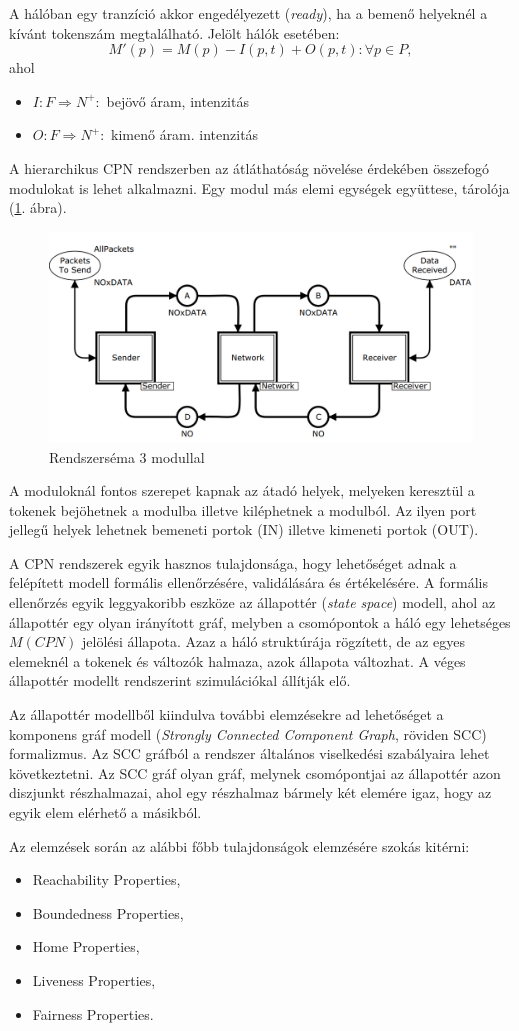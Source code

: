 A hálóban egy tranzíció akkor engedélyezett (\textit{ready}), ha a bemenő helyeknél a kívánt tokenszám megtalálható.
Jelölt hálók esetében:
\[
M'(p)=M(p)-I(p,t)+O(p,t): \forall p\in P,
\]
ahol 
\begin{itemize}
\item $I:F\Rightarrow N^+:$  bejövő áram, intenzitás
\item $O:F\Rightarrow N^+:$ kimenő áram. intenzitás
\end{itemize}

A hierarchikus CPN rendszerben az átláthatóság növelése érdekében összefogó modulokat is lehet alkalmazni. Egy modul más elemi egységek együttese, tárolója (\ref{fig:schema}. ábra).

\begin{figure}[h!]
\centering
\includegraphics[scale=0.5]{images/rendszersema3modul.png}
\caption{Rendszerséma 3 modullal}
\label{fig:schema}
\end{figure}

A moduloknál fontos szerepet kapnak az átadó helyek, melyeken keresztül a tokenek bejöhetnek a modulba illetve kiléphetnek a modulból. Az ilyen port jellegű helyek lehetnek bemeneti portok (IN) illetve kimeneti portok (OUT).  

A CPN rendszerek egyik hasznos tulajdonsága, hogy lehetőséget adnak a felépített modell formális ellenőrzésére, validálására és értékelésére. A formális ellenőrzés egyik leggyakoribb eszköze az állapottér (\textit{state space})  modell, ahol az állapottér egy olyan irányított gráf, melyben a csomópontok a háló egy lehetséges  $M(CPN)$ jelölési állapota. Azaz a háló struktúrája rögzített, de az egyes elemeknél a tokenek és változók halmaza, azok állapota változhat. A véges állapottér modellt rendszerint szimulációkal állítják elő. 

Az állapottér modellből kiindulva további elemzésekre ad lehetőséget a komponens gráf modell (\textit{Strongly Connected Component Graph}, röviden SCC) formalizmus. Az SCC gráfból a rendszer általános viselkedési szabályaira lehet következtetni. Az SCC gráf olyan gráf, melynek csomópontjai az állapottér azon diszjunkt részhalmazai, ahol egy részhalmaz bármely két elemére igaz, hogy az egyik elem  elérhető a másikból. 

Az elemzések során az alábbi főbb tulajdonságok elemzésére szokás kitérni:
\begin{itemize}
\item Reachability Properties,
\item Boundedness Properties,
\item Home Properties,
\item Liveness Properties,
\item Fairness Properties.
\end{itemize}

